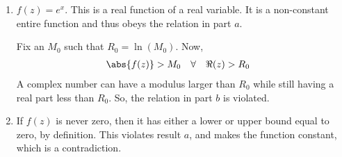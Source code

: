 \begin{enumerate}
\begin{enumerate}
              \item $ f(z) = e^x $. This is a real function of a real variable. It
                    is a non-constant entire function and thus obeys the relation in part
                    $ a $. \par
                    Fix an $ M_0 $ such that $ R_0 = \ln(M_0) $. Now,
                    \begin{align}
                        \abs{f(z)}             & > M_0 &
                        \forall \quad \Re{(z)} & > R_0
                    \end{align}
                    A complex number can have a modulus larger than $ R_0 $ while still
                    having a real part less than $R_0$. So, the relation in part $ b $ is
                    violated.

              \item If $ f(z) $ is never zero, then it has either a lower or upper bound
                    equal to zero, by definition. This violates result $ a $, and makes
                    the function constant, which is a contradiction.
          \end{enumerate}
\end{enumerate}
